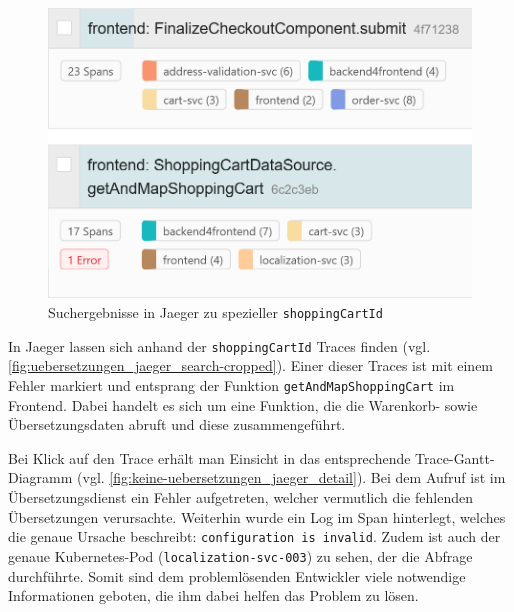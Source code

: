 \begin{figure}
\centering
\includegraphics[width=\linewidth]{img/05_ergebnis/keine-uebersetzungen_jaeger_search-cropped.png}
\caption{Suchergebnisse in Jaeger zu spezieller \texttt{shoppingCartId}}
\label{fig:uebersetzungen_jaeger_search-cropped}
\end{figure}

In Jaeger lassen sich anhand der \texttt{shopping\-Cart\-Id} Traces finden (vgl. \autoref{fig:uebersetzungen_jaeger_search-cropped}). Einer dieser Traces ist mit einem Fehler markiert und entsprang der Funktion \texttt{getAndMapShoppingCart} im Frontend. Dabei handelt es sich um eine Funktion, die die Warenkorb- sowie Übersetzungsdaten abruft und diese zusammengeführt.

Bei Klick auf den Trace erhält man Einsicht in das entsprechende Trace-Gantt-Diagramm (vgl. \autoref{fig:keine-uebersetzungen_jaeger_detail}). Bei dem Aufruf ist im Übersetzungsdienst ein Fehler aufgetreten, welcher vermutlich die fehlenden Übersetzungen verursachte. Weiterhin wurde ein Log im Span hinterlegt, welches die genaue Ursache beschreibt: \texttt{configuration is invalid}. Zudem ist auch der genaue Kubernetes-Pod (\texttt{localization-svc-003}) zu sehen, der die Abfrage durchführte. Somit sind dem problemlösenden Entwickler viele notwendige Informationen geboten, die ihm dabei helfen das Problem zu lösen.

